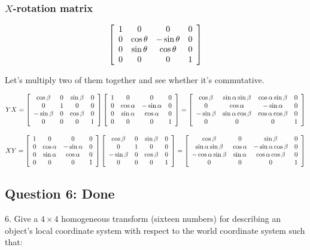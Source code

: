 \documentclass[11pt]{article}
\begin{document}
\begin{spacing}{1.2}
\subsubsection{$X$-rotation matrix}

$$
\left[
\begin{array}{cccc}
	1 & 0 & 0 & 0 \cr
	0 & \cos \theta & -\sin \theta & 0 \cr
	0 & \sin \theta & \cos \theta & 0 \cr
	0 & 0 & 0 & 1 \cr
\end{array}
\right]
$$

Let's multiply two of them together and see whether it's commutative.  

$$YX = 
\left[
\begin{array}{cccc}
	\cos \beta & 0 & \sin \beta & 0 \cr
	0 & 1 & 0 & 0 \cr
	-\sin \beta & 0  & \cos \beta & 0 \cr
	0 & 0 & 0 & 1 \cr
\end{array}
\right]
\left[
\begin{array}{cccc}
	1 & 0 & 0 & 0 \cr
	0 & \cos \alpha & -\sin \alpha & 0 \cr
	0 & \sin \alpha & \cos \alpha & 0 \cr
	0 & 0 & 0 & 1 \cr
\end{array}
\right]
=\left[
\begin{array}{cccc}
	\cos \beta & \sin \alpha \sin \beta & \cos \alpha \sin \beta & 0 \cr
	0 & \cos \alpha & -\sin \alpha & 0 \cr
	-\sin \beta & \sin \alpha \cos \beta & \cos \alpha \cos \beta & 0 \cr
	0 & 0 & 0 & 1 \cr
\end{array}
\right]
$$

$$XY = 
\left[
\begin{array}{cccc}
	1 & 0 & 0 & 0 \cr
	0 & \cos \alpha & -\sin \alpha & 0 \cr
	0 & \sin \alpha & \cos \alpha & 0 \cr
	0 & 0 & 0 & 1 \cr
\end{array}
\right]
\left[
\begin{array}{cccc}
	\cos \beta & 0 & \sin \beta & 0 \cr
	0 & 1 & 0 & 0 \cr
	-\sin \beta & 0  & \cos \beta & 0 \cr
	0 & 0 & 0 & 1 \cr
\end{array}
\right]
=\left[
\begin{array}{cccc}
	\cos \beta & 0 & \sin \beta & 0 \cr
	\sin \alpha \sin \beta & \cos \alpha & -\sin \alpha \cos \beta & 0 \cr
	-\cos \alpha \sin \beta & \sin \alpha & \cos \alpha \cos \beta & 0 \cr
	0 & 0 & 0 & 1 \cr
\end{array}
\right]
$$



\subsection{Question 6:  Done}
6.  Give a $4 \times 4$ homogeneous transform (sixteen numbers) for describing an object's local coordinate system with respect to the world coordinate system such that:


\end{spacing}
\end{document}
